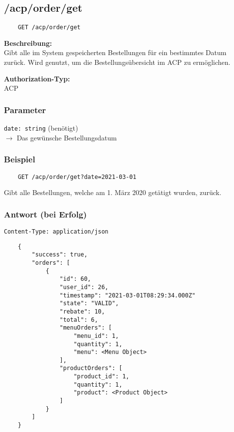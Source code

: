 \subsection{/acp/order/get}

\begin{lstlisting}
    GET /acp/order/get
\end{lstlisting}

\textbf{Beschreibung:} \\
Gibt alle im System gespeicherten Bestellungen für ein bestimmtes Datum zurück. Wird genutzt, um die Bestellungsübersicht im ACP zu ermöglichen.

\textbf{Authorization-Typ:} \\
ACP

\subsubsection{Parameter}

\lstinline{date: string} (benötigt) \\
$\rightarrow$ Das gewünsche Bestellungsdatum

\subsubsection{Beispiel}

\begin{lstlisting}
    GET /acp/order/get?date=2021-03-01
\end{lstlisting}

Gibt alle Bestellungen, welche am 1. März 2020 getätigt wurden, zurück.

\subsubsection{Antwort (bei Erfolg)}

\lstinline{Content-Type: application/json}
\begin{lstlisting}
    {
        "success": true, 
        "orders": [
            {
                "id": 60,
                "user_id": 26,
                "timestamp": "2021-03-01T08:29:34.000Z"
                "state": "VALID",
                "rebate": 10,
                "total": 6,
                "menuOrders": [
                    "menu_id": 1,
                    "quantity": 1,
                    "menu": <Menu Object>
                ],
                "productOrders": [
                    "product_id": 1,
                    "quantity": 1,
                    "product": <Product Object>
                ]
            }
        ]
    }
\end{lstlisting}
